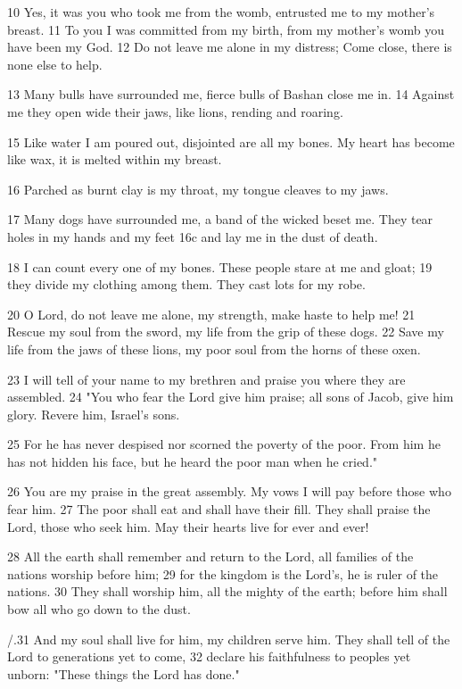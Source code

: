 10 Yes, it was you who took me from the womb,
entrusted me to my mother's breast.
11 To you I was committed from my birth,
from my mother's womb you have been my God.
12 Do not leave me alone in my distress;
Come close, there is none else to help.

13 Many bulls have surrounded me,
fierce bulls of Bashan close me in.
14 Against me they open wide their jaws,
like lions, rending and roaring.

15 Like water I am poured out,
disjointed are all my bones.
My heart has become like wax,
it is melted within my breast.

16 Parched as burnt clay is my throat,
my tongue cleaves to my jaws.

17 Many dogs have surrounded me,
a band of the wicked beset me.
They tear holes in my hands and my feet
16c and lay me in the dust of death.

18 I can count every one of my bones.
These people stare at me and gloat;
19 they divide my clothing among them.
They cast lots for my robe.

20 O Lord, do not leave me alone,
my strength, make haste to help me!
21 Rescue my soul from the sword,
my life from the grip of these dogs.
22 Save my life from the jaws of these lions,
my poor soul from the horns of these oxen.

23 I will tell of your name to my brethren
and praise you where they are assembled.
24 "You who fear the Lord give him praise;
all sons of Jacob, give him glory.
Revere him, Israel's sons.

25 For he has never despised
nor scorned the poverty of the poor.
From him he has not hidden his face,
but he heard the poor man when he cried."

26 You are my praise in the great assembly.
My vows I will pay before those who fear him.
27 The poor shall eat and shall have their fill.
They shall praise the Lord, those who seek him.
May their hearts live for ever and ever!

28 All the earth shall remember and return to the Lord,
all families of the nations worship before him;
29 for the kingdom is the Lord's, he is ruler of the nations.
30 They shall worship him, all the mighty of the earth;
before him shall bow all who go down to the dust.

/.31 And my soul shall live for him, my children serve him.
They shall tell of the Lord to generations yet to come,
32 declare his faithfulness to peoples yet unborn:
"These things the Lord has done."


